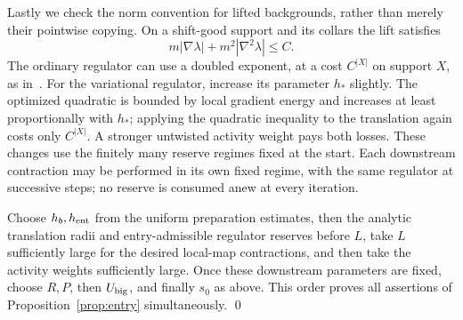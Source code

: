 Lastly we check the norm convention for lifted backgrounds, rather
than merely their pointwise copying. On a shift-good support and
its collars the lift satisfies
\[
            m|\nabla\lambda|+m^2|\nabla^2\lambda|\le C.
\]
The ordinary regulator can use a doubled exponent, at a cost
$C^{|X|}$ on support $X$, as in~\cite[Proof of
Proposition 5.7]{B}. For the variational regulator, increase
its parameter $h_*$ slightly. The optimized quadratic is bounded
by local gradient energy and increases at least proportionally
with $h_*$; applying the quadratic inequality to the translation
again costs only $C^{|X|}$. A stronger untwisted activity weight
pays both losses. These changes use the finitely many reserve
regimes fixed at the start. Each downstream contraction may be
performed in its own fixed regime, with the same regulator at
successive steps; no reserve is consumed anew at every iteration.

Choose $h_b,h_{\rm ent}$ from the uniform preparation estimates,
then the analytic translation radii and entry-admissible regulator
reserves before
$L$, take $L$ sufficiently large for the desired local-map
contractions, and then take the activity weights sufficiently
large. Once these downstream parameters are fixed, choose $R,P$,
then $U_{\rm big}$, and finally $s_0$ as above. This order proves
all assertions of Proposition~\ref{prop:entry} simultaneously.
\qed
